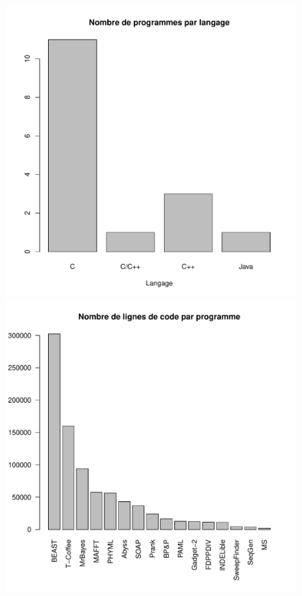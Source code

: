 \begin{figure}[!h]
  \includegraphics[width=\linewidth]{figures/prog_lang.pdf}
  \caption{}\label{fig:prog_lang}
  \endminipage\hfill
  \includegraphics[width=\linewidth]{figures/lin_prog.pdf}

\end{figure}

